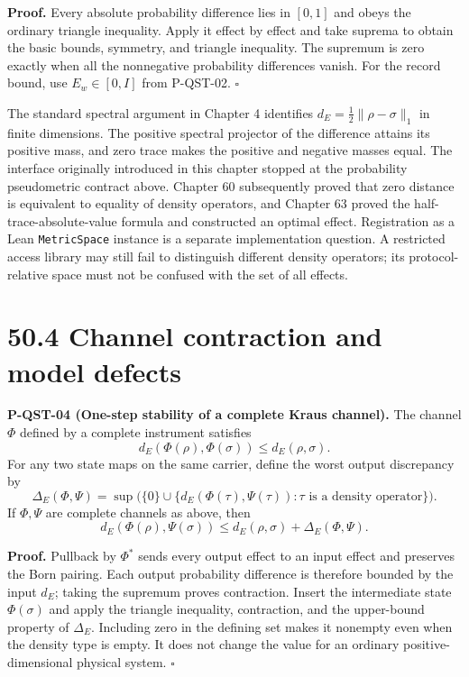 \documentclass[
  11pt,
  oneside]{book}
\begin{document}
\textbf{Proof.} Every absolute probability difference lies in \([0,1]\)
and obeys the ordinary triangle inequality. Apply it effect by effect
and take suprema to obtain the basic bounds, symmetry, and triangle
inequality. The supremum is zero exactly when all the nonnegative
probability differences vanish. For the record bound, use
\(E_w\in[0,I]\) from P-QST-02. \(\square\)

The standard spectral argument in Chapter 4 identifies
\(d_E=\tfrac12\|\rho-\sigma\|_1\) in finite dimensions. The positive
spectral projector of the difference attains its positive mass, and zero
trace makes the positive and negative masses equal. The interface
originally introduced in this chapter stopped at the probability
pseudometric contract above. Chapter 60 subsequently proved that zero
distance is equivalent to equality of density operators, and Chapter 63
proved the half-trace-absolute-value formula and constructed an optimal
effect. Registration as a Lean \texttt{Metric\allowbreak Space} instance is a
separate implementation question. A restricted access library may still
fail to distinguish different density operators; its protocol-relative
space must not be confused with the set of all effects.

\section{50.4 Channel contraction and model defects}

\label{p-qst-04}{}

\textbf{P-QST-04 (One-step stability of a complete Kraus channel).} The
channel \(\Phi\) defined by a complete instrument satisfies \[
d_E(\Phi(\rho),\Phi(\sigma))\le d_E(\rho,\sigma).
\] For any two state maps on the same carrier, define the worst output
discrepancy by \[
\Delta_E(\Phi,\Psi)=\sup\bigl(\{0\}\cup
\{d_E(\Phi(\tau),\Psi(\tau)):\tau\text{ is a density operator}\}\bigr).
\] If \(\Phi,\Psi\) are complete channels as above, then \[
d_E(\Phi(\rho),\Psi(\sigma))
\le d_E(\rho,\sigma)+\Delta_E(\Phi,\Psi).
\]

\textbf{Proof.} Pullback by \(\Phi^*\) sends every output effect to an
input effect and preserves the Born pairing. Each output probability
difference is therefore bounded by the input \(d_E\); taking the
supremum proves contraction. Insert the intermediate state
\(\Phi(\sigma)\) and apply the triangle inequality, contraction, and the
upper-bound property of \(\Delta_E\). Including zero in the defining set
makes it nonempty even when the density type is empty. It does not
change the value for an ordinary positive-dimensional physical system.
\(\square\)
\end{document}

